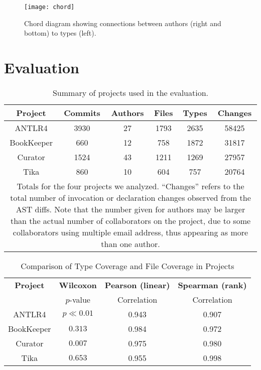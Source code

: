 \begin{figure*}[p]
\centering
\texttt{[image: chord]}
\caption{Chord diagram showing connections between authors (right and bottom) to types (left).}
\label{fig:chord}
\end{figure*}

\section{Evaluation}

\begin{table}[t]
\renewcommand{\arraystretch}{1.3}
\centering
\caption{Summary of projects used in the evaluation.}
\label{tab:project-summary}
\begin{tabular}{c|ccccc}
\hline
\bfseries Project & \bfseries Commits & \bfseries Authors & \bfseries Files &   \bfseries Types &  \bfseries  Changes\\
\hline
ANTLR4 & 3930 & 27 & 1793 & 2635 & 58425\\
BookKeeper & 660 & 12 & 758 & 1872 & 31817\\
Curator & 1524 & 43 & 1211 & 1269 & 27957\\
Tika & 860 & 10 & 604 & 757 & 20764\\
\hline
\multicolumn{6}{p{3.25in}}{\footnotesize Totals for the four projects we analyzed. ``Changes'' refers to the total number of invocation or declaration changes observed from the AST diffs. Note that the number given for authors may be larger than the actual number of collaborators on the project, due to some collaborators using multiple email address, thus appearing as more than one author.}
\end{tabular}
\end{table}

\begin{table}[ht]
\renewcommand{\arraystretch}{1.3}
\caption{Comparison of Type Coverage and File Coverage in Projects}
\label{tab:summary}
\centering
\begin{tabular}{c|ccc}
\hline
\bfseries Project & \bfseries Wilcoxon& \bfseries Pearson (linear) & \bfseries Spearman (rank) \\
& $p$-value & Correlation & Correlation \\
\hline
ANTLR4 & $p\ll0.01$ & 0.943 & 0.907\\
BookKeeper & $0.313$ & 0.984 & 0.972\\
Curator & $0.007$ & 0.975 & 0.980\\
Tika & $0.653$ & 0.955 & 0.998\\
\hline
\end{tabular}
\end{table}

